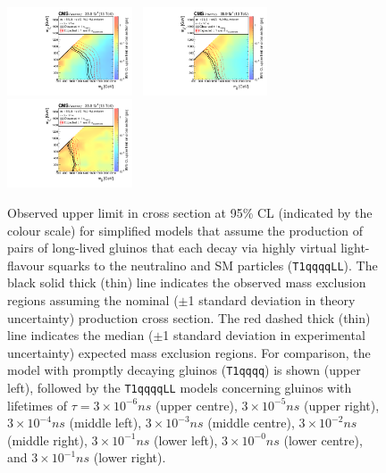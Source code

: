\begin{figure}[!t]
  \includegraphics[width=0.33\textwidth]{Figures/T1qqqqLL100XSEC}~
  \includegraphics[width=0.33\textwidth]{Figures/T1qqqqLL1000XSEC}~
  \includegraphics[width=0.33\textwidth]{Figures/T1qqqqLL10000XSEC}\\
  \caption{Observed upper limit in cross section at 95\% CL (indicated
    by the colour scale) for simplified models that assume the
    production of pairs of long-lived gluinos that each decay via
    highly virtual light-flavour squarks to the neutralino and SM
    particles (\texttt{T1qqqqLL}). The black solid thick (thin) line
    indicates the observed mass exclusion regions assuming the nominal
    ($\pm$1 standard deviation in theory uncertainty) production cross
    section. The red dashed thick (thin) line indicates the median
    ($\pm$1 standard deviation in experimental uncertainty) expected
    mass exclusion regions. For comparison, the model with promptly
    decaying gluinos (\texttt{T1qqqq}) is shown (upper left), followed
    by the \texttt{T1qqqqLL} models concerning gluinos with lifetimes
    of $\tau = 3{\times}10^{-6}\unit{ns}$ (upper centre),
    $3{\times}10^{-5}\unit{ns}$ (upper right),
    $3{\times}10^{-4}\unit{ns}$ (middle left),
    $3{\times}10^{-3}\unit{ns}$ (middle centre),
    $3{\times}10^{-2}\unit{ns}$ (middle right),
    $3{\times}10^{-1}\unit{ns}$ (lower left),
    $3{\times}10^{-0}\unit{ns}$ (lower centre), and
    $3{\times}10^{-1}\unit{ns}$ (lower right).}
  \label{fig:limits} 
\end{figure} 

